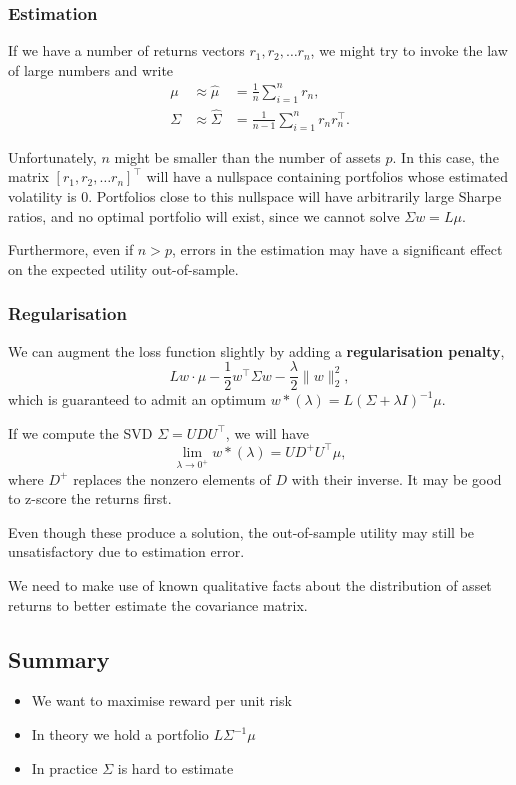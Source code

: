 \documentclass{article}
\begin{document}
\subsubsection{Estimation}
If we have a number of returns vectors $r_1,r_2,\ldots r_n$, we might try to invoke the law of large numbers and write
\begin{align*}
	\mu	&\approx \hat{\mu}	&= \frac{1}{n} \sum_{i=1}^n r_n,
\\	\Sigma	&\approx \hat{\Sigma}	&= \frac{1}{n-1} \sum_{i=1}^n r_n r_n^\top.
\end{align*}

Unfortunately, $n$ might be smaller than the number of assets $p$. In this case, the matrix $[r_1,r_2,\ldots r_n]^\top$ will have a nullspace containing portfolios whose estimated volatility is $0$. Portfolios close to this nullspace will have arbitrarily large Sharpe ratios, and no optimal portfolio will exist, since we cannot solve $\Sigma w = L\mu$.

Furthermore, even if $n>p$, errors in the estimation may have a significant effect on the expected utility out-of-sample.

\subsubsection{Regularisation}
We can augment the loss function slightly by adding a \textbf{regularisation penalty},
$$Lw\cdot\mu-\frac{1}{2}w^\top\Sigma w-\frac{\lambda}{2}\|w\|_2^2,$$
which is guaranteed to admit an optimum $w*(\lambda) = L(\Sigma+\lambda I)^{-1}\mu$.

If we compute the SVD $\Sigma=UDU^\top$, we will have
$$\lim_{\lambda\to 0^+}w*(\lambda) = UD^+U^\top\mu,$$
where $D^+$ replaces the nonzero elements of $D$ with their inverse. It may be good to z-score the returns first.%

Even though these produce a solution, the out-of-sample utility may still be unsatisfactory due to estimation error.

We need to make use of known qualitative facts about the distribution of asset returns to better estimate the covariance matrix.

\subsection{Summary}
\begin{itemize}
	\item We want to maximise reward per unit risk
	\item In theory we hold a portfolio $L\Sigma^{-1}\mu$
	\item In practice $\Sigma$ is hard to estimate
\end{itemize}
\end{document}
